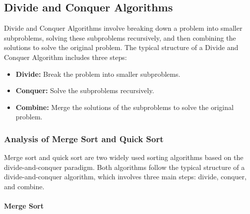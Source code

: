 \documentclass[12pt]{book} %
\begin{document}
\subsection{Divide and Conquer Algorithms}
Divide and Conquer Algorithms involve breaking down a problem into smaller subproblems, solving these subproblems recursively, and then combining the solutions to solve the original problem. The typical structure of a Divide and Conquer Algorithm includes three steps:
\begin{itemize}
  \item \textbf{Divide:} Break the problem into smaller subproblems.
  \item \textbf{Conquer:} Solve the subproblems recursively.
  \item \textbf{Combine:} Merge the solutions of the subproblems to solve the original problem.
\end{itemize}

\subsubsection{Analysis of Merge Sort and Quick Sort}

Merge sort and quick sort are two widely used sorting algorithms based on the divide-and-conquer paradigm. Both algorithms follow the typical structure of a divide-and-conquer algorithm, which involves three main steps: divide, conquer, and combine.

\paragraph{Merge Sort}
\end{document}
